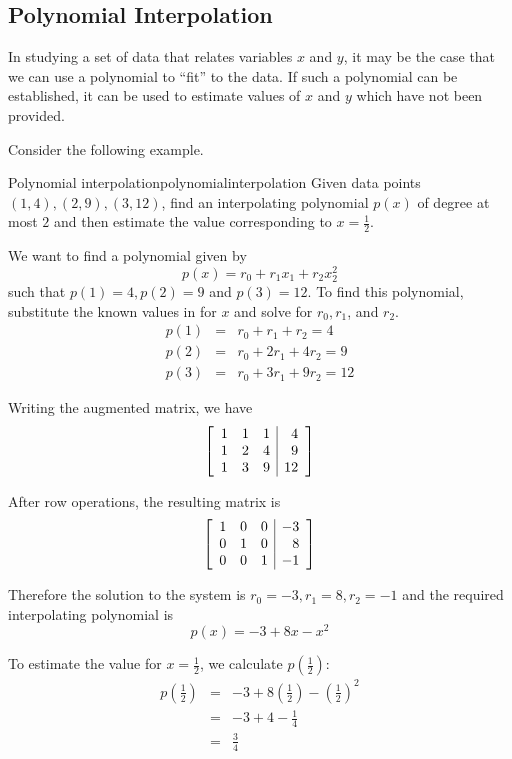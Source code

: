 \subsection{Polynomial Interpolation}

In studying a set of data that relates variables $x$ and $y$, it may be the case that we can use a polynomial to ``fit'' to the data. If such a polynomial can be established, it can be used to estimate values of $x$ and $y$ which have not been provided. 

Consider the following example.

\begin{example}{Polynomial interpolation}{polynomialinterpolation}
Given data points $(1,4), (2,9), (3,12)$, find an interpolating polynomial $p(x)$ of degree at most $2$ and then estimate the value corresponding to $x = \frac{1}{2}$. 
\end{example}

\begin{solution}
We want to find a polynomial given by 
\[
p(x) = r_0 + r_1x_1 + r_2x_2^2
\]
such that $p(1)=4, p(2)=9$ and $p(3)=12$. 
To find this polynomial, substitute the known values in for $x$ and solve for $r_0, r_1$, and $r_2$. 
\begin{eqnarray*}
p(1) &=& r_0 + r_1 + r_2 = 4\\
p(2) &=& r_0 + 2r_1 + 4r_2 = 9\\
p(3) &=& r_0 + 3r_1 + 9r_2 = 12
\end{eqnarray*}

Writing the augmented matrix, we have
\[
\left[
\begin{array}{rrr|r}
1 & 1 & 1 & 4 \\
1 & 2 & 4 & 9  \\
1 & 3 & 9 & 12 
\end{array}
\right]
\]

After row operations, the resulting matrix is
\[
\left[
\begin{array}{rrr|r}
1 & 0 & 0 & -3 \\
0 & 1 & 0 & 8 \\
0 & 0 & 1 & -1 
\end{array}
\right]
\]

Therefore the solution to the system is $r_0 = -3, r_1 = 8, r_2 = -1$ and the required interpolating polynomial is 
\[
p(x) = -3 + 8x - x^2
\]

To estimate the value for $x = \frac{1}{2}$, we calculate $p(\frac{1}{2})$: 
\begin{eqnarray*}
p(\frac{1}{2}) &=& -3 + 8(\frac{1}{2}) - (\frac{1}{2})^2\\
&=& -3 + 4 - \frac{1}{4} \\
&=& \frac{3}{4}
\end{eqnarray*}
\end{solution}

